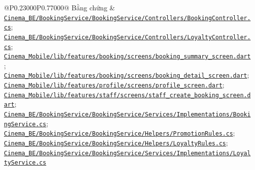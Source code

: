 \begin{longtable}{@{}P{0.23000\SRSWidth}P{0.77000\SRSWidth}@{}}
Bằng chứng & \href{../../../Cinema\_BE/BookingService/BookingService/Controllers/BookingController.cs}{\texttt{Cinema\_\allowbreak{}BE/\allowbreak{}Booking\allowbreak{}Service/\allowbreak{}Booking\allowbreak{}Service/\allowbreak{}Controll\allowbreak{}ers/\allowbreak{}Booking\allowbreak{}Controll\allowbreak{}er.\allowbreak{}cs}}; \href{../../../Cinema\_BE/BookingService/BookingService/Controllers/LoyaltyController.cs}{\texttt{Cinema\_\allowbreak{}BE/\allowbreak{}Booking\allowbreak{}Service/\allowbreak{}Booking\allowbreak{}Service/\allowbreak{}Controll\allowbreak{}ers/\allowbreak{}Loyalty\allowbreak{}Controll\allowbreak{}er.\allowbreak{}cs}}; \href{../../../Cinema\_Mobile/lib/features/booking/screens/booking\_summary\_screen.dart}{\texttt{Cinema\_\allowbreak{}Mobile/\allowbreak{}lib/\allowbreak{}features\allowbreak{}/\allowbreak{}booking/\allowbreak{}screens/\allowbreak{}booking\_\allowbreak{}summary\_\allowbreak{}screen.\allowbreak{}dart}}; \href{../../../Cinema\_Mobile/lib/features/booking/screens/booking\_detail\_screen.dart}{\texttt{Cinema\_\allowbreak{}Mobile/\allowbreak{}lib/\allowbreak{}features\allowbreak{}/\allowbreak{}booking/\allowbreak{}screens/\allowbreak{}booking\_\allowbreak{}detail\_\allowbreak{}screen.\allowbreak{}dart}}; \href{../../../Cinema\_Mobile/lib/features/profile/screens/profile\_screen.dart}{\texttt{Cinema\_\allowbreak{}Mobile/\allowbreak{}lib/\allowbreak{}features\allowbreak{}/\allowbreak{}profile/\allowbreak{}screens/\allowbreak{}profile\_\allowbreak{}screen.\allowbreak{}dart}}; \href{../../../Cinema\_Mobile/lib/features/staff/screens/staff\_create\_booking\_screen.dart}{\texttt{Cinema\_\allowbreak{}Mobile/\allowbreak{}lib/\allowbreak{}features\allowbreak{}/\allowbreak{}staff/\allowbreak{}screens/\allowbreak{}staff\_\allowbreak{}create\_\allowbreak{}booking\_\allowbreak{}screen.\allowbreak{}dart}}; \href{../../../Cinema\_BE/BookingService/BookingService/Services/Implementations/BookingService.cs}{\texttt{Cinema\_\allowbreak{}BE/\allowbreak{}Booking\allowbreak{}Service/\allowbreak{}Booking\allowbreak{}Service/\allowbreak{}Services\allowbreak{}/\allowbreak{}Implemen\allowbreak{}tations/\allowbreak{}Booking\allowbreak{}Service.\allowbreak{}cs}}; \href{../../../Cinema\_BE/BookingService/BookingService/Helpers/PromotionRules.cs}{\texttt{Cinema\_\allowbreak{}BE/\allowbreak{}Booking\allowbreak{}Service/\allowbreak{}Booking\allowbreak{}Service/\allowbreak{}Helpers/\allowbreak{}Promotio\allowbreak{}n\allowbreak{}Rules.\allowbreak{}cs}}; \href{../../../Cinema\_BE/BookingService/BookingService/Helpers/LoyaltyRules.cs}{\texttt{Cinema\_\allowbreak{}BE/\allowbreak{}Booking\allowbreak{}Service/\allowbreak{}Booking\allowbreak{}Service/\allowbreak{}Helpers/\allowbreak{}Loyalty\allowbreak{}Rules.\allowbreak{}cs}}; \href{../../../Cinema\_BE/BookingService/BookingService/Services/Implementations/LoyaltyService.cs}{\texttt{Cinema\_\allowbreak{}BE/\allowbreak{}Booking\allowbreak{}Service/\allowbreak{}Booking\allowbreak{}Service/\allowbreak{}Services\allowbreak{}/\allowbreak{}Implemen\allowbreak{}tations/\allowbreak{}Loyalty\allowbreak{}Service.\allowbreak{}cs}} \\[3pt]

\end{longtable}
